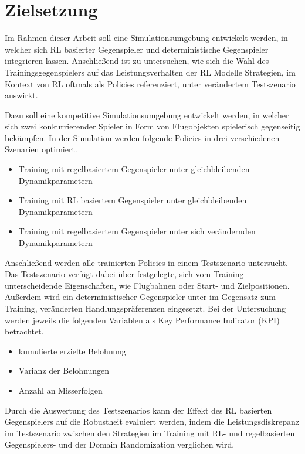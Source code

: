 \section{Zielsetzung}

Im Rahmen dieser Arbeit soll eine Simulationsumgebung entwickelt werden, in welcher sich RL basierter Gegenspieler und deterministische Gegenspieler integrieren lassen.
Anschließend ist zu untersuchen, wie sich die Wahl des Trainingsgegenspielers auf das Leistungsverhalten der RL Modelle Strategien, im Kontext von RL oftmals als Policies referenziert, unter verändertem Testszenario auswirkt.

Dazu soll eine kompetitive Simulationsumgebung entwickelt werden, in welcher sich zwei konkurrierender Spieler in Form von Flugobjekten spielerisch gegenseitig bekämpfen.
In der Simulation werden folgende Policies in drei verschiedenen Szenarien optimiert.

\begin{itemize}
    \item Training mit regelbasiertem Gegenspieler unter gleichbleibenden Dynamikparametern
    \item Training mit RL basiertem Gegenspieler unter gleichbleibenden Dynamikparametern
    \item Training mit regelbasiertem Gegenspieler unter sich verändernden Dynamikparametern
\end{itemize}

Anschließend werden alle trainierten Policies in einem Testszenario untersucht.
Das Testszenario verfügt dabei über festgelegte, sich vom Training unterscheidende Eigenschaften, wie Flugbahnen oder Start- und Zielpositionen.
Außerdem wird ein deterministischer Gegenspieler unter im Gegensatz zum Training, veränderten Handlungspräferenzen eingesetzt.
Bei der Untersuchung werden jeweils die folgenden Variablen als Key Performance Indicator (KPI) betrachtet.
\begin{itemize}
    \item kumulierte erzielte Belohnung
    \item Varianz der Belohnungen
    \item Anzahl an Misserfolgen
\end{itemize}

Durch die Auswertung des Testszenarios kann der Effekt des RL basierten Gegenspielers auf die Robustheit evaluiert werden, indem die Leistungsdiskrepanz im Testszenario zwischen den Strategien im Training mit RL- und regelbasierten Gegenspielers- und der Domain Randomization verglichen wird.

